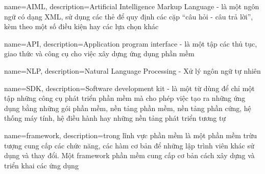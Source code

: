 
{
    name=AIML,
    description={Artificial Intelligence Markup Language - là một ngôn ngữ có dạng XML, sử dụng các thẻ để quy định các cặp ``câu hỏi - câu trả lời'', kèm theo một số điều kiện hay các lựa chọn khác}
}

{
    name=API,
    description={Application program interface - là một tập các thủ tục, giao thức và công cụ cho việc xây dựng ứng dụng phần mềm}
}

{
    name=NLP,
    description={Natural Language Processing - Xử lý ngôn ngữ tự nhiên}
}

{
    name=SDK,
    description={Software development kit - là một từ dùng để chỉ một tập những công cụ phát triển phần mềm mà cho phép việc tạo ra những ứng dụng bằng những gói phần mềm, nền tảng phần mềm, nền tảng phần cứng, hệ thống máy tính, hệ điều hành hay những nền tảng phát triển tương tự}
}

{
    name=framework,
    description={trong lĩnh vực phần mềm là một phần mềm trừu tượng cung cấp các chức năng, các hàm cơ bản để những lập trình viên khác sử dụng và thay đổi. Một framework phần mềm cung cấp cơ bản cách xây dựng và triển khai các ứng dụng}
}
